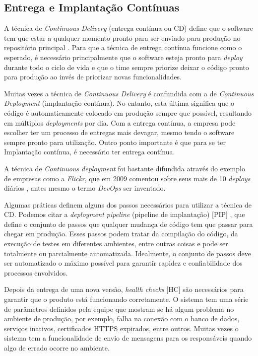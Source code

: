 \subsection{Entrega e Implantação Contínuas}

A técnica de \emph{Continuous Delivery} (entrega contínua ou CD) define que o software tem que estar a qualquer momento pronto para ser enviado para produção no repositório principal \cite{fowlerCD}. Para que a técnica de entrega contínua funcione como o esperado, é necessário principalmente que o software esteja pronto para \emph{deploy} durante todo o ciclo de vida e que o time sempre priorize deixar o código pronto para produção ao invés de priorizar novas funcionalidades.

Muitas vezes a técnica de \emph{Continuous Delivery} é confundida com a de \emph{Continuous Deployment} (implantação contínua). No entanto, esta última significa que o código é automaticamente colocado em produção sempre que possível, resultando em múltiplos \emph{deployments} por dia. Com a entrega contínua, a empresa pode escolher ter um processo de entregas mais devagar, mesmo tendo o software sempre pronto para utilização. Outro ponto importante é que para se ter Implantação contínua, é necessário ter entrega contínua.

A técnica de \emph{Continuous deployment} foi bastante difundida através do exemplo de empresas como a \emph{Flickr}, que em 2009 comentou sobre seus mais de 10 \emph{deploys} diários \cite{flickrTalk}, antes mesmo o termo \emph{DevOps} ser inventado. 

Algumas práticas definem alguns dos passos necessários para utilizar a técnica de CD. Podemos citar a \emph{deployment pipeline} (pipeline de implantação) [PIP] \cite{devopsBook}, que define o conjunto de passos que qualquer mudança de código tem que passar para chegar em produção. Esses passos podem tratar da compilação do código, da execução de testes em diferentes ambientes, entre outras coisas e pode ser totalmente ou parcialmente automatizada. Idealmente, o conjunto de passos deve ser automatizado o máximo possível para garantir rapidez e confiabilidade dos processos envolvidos.

Depois da entrega de uma nova versão, \emph{health checks} [HC] \cite{devopsBook} são necessários para garantir que o produto está funcionando corretamente. O sistema tem uma série de parâmetros definidos pela equipe que mostram se há algum problema no ambiente de produção, por exemplo, falha na conexão com o banco de dados, serviços inativos, certificados HTTPS expirados, entre outros. Muitas vezes o sistema tem a funcionalidade de envio de mensagens para os responsáveis quando algo de errado ocorre no ambiente.

